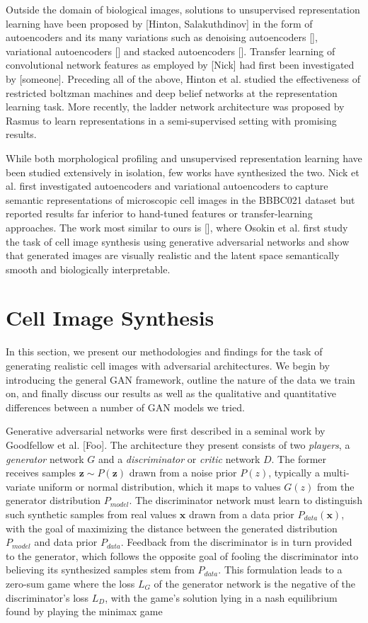 \documentclass{article}
\begin{document}
Outside the domain of biological images, solutions to unsupervised representation learning have been proposed by [Hinton, Salakuthdinov] in the form of autoencoders and its many variations such as denoising autoencoders [], variational autoencoders [] and stacked autoencoders []. Transfer learning of convolutional network features as employed by [Nick] had first been investigated by [someone]. Preceding all of the above, Hinton et al. studied the effectiveness of restricted boltzman machines and deep belief networks at the representation learning task. More recently, the ladder network architecture was proposed by Rasmus to learn representations in a semi-supervised setting with promising results.


While both morphological profiling and unsupervised representation learning have been studied extensively in isolation, few works have synthesized the two. Nick et al. first investigated autoencoders and variational autoencoders to capture semantic representations of microscopic cell images in the BBBC021 dataset but reported results far inferior to hand-tuned features or transfer-learning approaches. The work most similar to ours is [], where Osokin et al. first study the task of cell image synthesis using generative adversarial networks and show that generated images are visually realistic and the latent space semantically smooth and biologically interpretable.

\section{Cell Image Synthesis}

In this section, we present our methodologies and findings for the task of generating realistic cell images with adversarial architectures. We begin by introducing the general GAN framework, outline the nature of the data we train on, and finally discuss our results as well as the qualitative and quantitative differences between a number of GAN models we tried.

Generative adversarial networks were first described in a seminal work by Goodfellow et al. [Foo]. The architecture they present consists of two \emph{players}, a \emph{generator} network $G$ and a \emph{discriminator} or \emph{critic} network $D$. The former receives samples $\mathbf{z} \sim P(\mathbf{z})$ drawn from a noise prior $P(z)$, typically a multi-variate uniform or normal distribution, which it maps to values $G(z)$ from the generator distribution $P_{model}$. The discriminator network must learn to distinguish such synthetic samples from real values $\mathbf{x}$ drawn from a data prior $P_{data}(\mathbf{x})$, with the goal of maximizing the distance between the generated distribution $P_{model}$ and data prior $P_{data}$. Feedback from the discriminator is in turn provided to the generator, which follows the opposite goal of fooling the discriminator into believing its synthesized samples stem from $P_{data}$. This formulation leads to a zero-sum game where the loss $L_G$ of the generator network is the negative of the discriminator's loss $L_D$, with the game's solution lying in a nash equilibrium found by playing the minimax game
\end{document}
